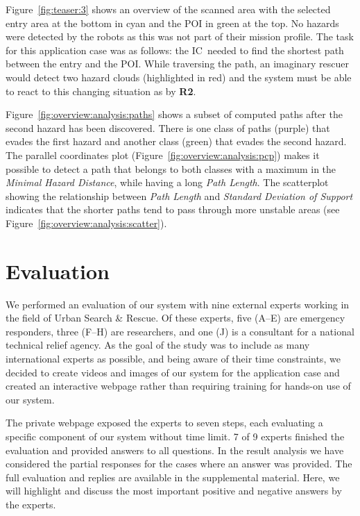 \documentclass{egpubl}
\def\IC{IC}
\begin{document}
Figure~\ref{fig:teaser:3} shows an overview of the scanned area with the selected entry area at the bottom in cyan and the POI in green at the top. No hazards were detected by the robots as this was not part of their mission profile. The task for this application case was as follows: the \IC\ needed to find the shortest path between the entry and the POI. While traversing the path, an imaginary rescuer would detect two hazard clouds (highlighted in red) and the system must be able to react to this changing situation as by {\bfseries R2}.

Figure~\ref{fig:overview:analysis:paths} shows a subset of computed paths after the second hazard has been discovered. There is one class of paths (purple) that evades the first hazard and another class (green) that evades the second hazard. The parallel coordinates plot (Figure~\ref{fig:overview:analysis:pcp}) makes it possible to detect a path that belongs to both classes with a maximum in the \emph{Minimal Hazard Distance}, while having a long \emph{Path Length}. The scatterplot showing the relationship between \emph{Path Length} and \emph{Standard Deviation of Support} indicates that the shorter paths tend to pass through more unstable areas (see Figure~\ref{fig:overview:analysis:scatter}).


\section{Evaluation} \label{sec:evaluation}
We performed an evaluation of our system with nine external experts working in the field of Urban Search \& Rescue. Of these experts, five (A--E) are emergency responders, three (F--H) are researchers, and one (J) is a consultant for a national technical relief agency. As the goal of the study was to include as many international experts as possible, and being aware of their time constraints, we decided to create videos and images of our system for the application case and created an interactive webpage rather than requiring training for hands-on use of our system.

The private webpage exposed the experts to seven steps, each evaluating a specific component of our system without time limit. 7 of 9 experts finished the evaluation and provided answers to all questions. In the result analysis we have considered the partial responses for the cases where an answer was provided. The full evaluation and replies are available in the supplemental material. Here, we will highlight and discuss the most important positive and negative answers by the experts. 
\end{document}
